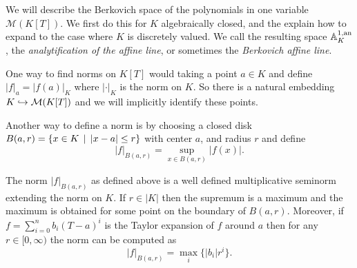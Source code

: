 We will describe the Berkovich space of the polynomials in one variable  $\mathcal{M} (K[T])$.
We first do this for $K$ algebraically closed, and the explain how to expand to the case where $K$ is discretely valued.
We call the resulting space $\mathbb{A}_K^{1, \text{an}}$, the \emph{analytification of the affine line}, or sometimes the \emph{Berkovich affine line}. 

\medskip

One way to find norms on $K[T]$ would taking a point $a \in K$ and define $|f|_a = |f(a)|_K$ where $|\cdot |_K$ is the norm on $K$. 
So there is a natural embedding $K \hookrightarrow \mathcal{M}(K[T])$ and we will implicitly identify these points.  

Another way to define a norm is by choosing a closed disk $B(a, r) = \{x \in K \st |x - a| \le r\} $ with center $a$, and radius $r$ and define \[
	|f|_{B(a, r)} = \sup_{x \in B(a, r)} |f(x)|
.\] 
\begin{claim}
	The norm $|f|_{B(a, r)}$ as defined above is a well defined multiplicative seminorm extending the norm on $K$. 
	If $r \in |K|$ then the supremum is a maximum and the maximum is obtained for some point on the boundary of $B(a, r)$.
	Moreover, if  $f = \sum_{i = 0}^{n} b_i (T-a)^{i}$ is the Taylor expansion of $f$ around $a$ then for any $r \in [0, \infty)$ the norm can be computed as \begin{equation}\label{eq:norm_disk_taylor}
		|f|_{B(a, r)} = \max_{i}\{  |b_i|r^{i}\}
	.\end{equation} 
\end{claim}
